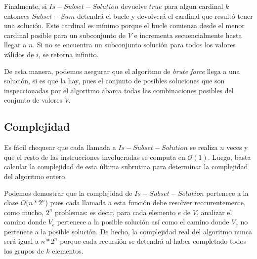 Finalmente, si $Is-Subset-Solution$ devuelve $true$ para algun cardinal $k$ entonces $Subset-Sum$ detendrá el bucle y devolverá el cardinal que resultó tener una solución. Este cardinal es mínimo porque el bucle comienza desde el menor cardinal posible para un subconjunto de $V$ e incrementa secuencialmente hasta llegar a $n$. Si no se encuentra un subconjunto solución para todos los valores válidos de $i$, se retorna infinito.

\vskip 8pt

De esta manera, podemos asegurar que el algoritmo de \textit{brute force} llega a una solución, si es que la hay, pues el conjunto de posibles soluciones que son inspeccionadas por el algoritmo abarca todas las combinaciones posibles del conjunto de valores $V$.

\subsection{Complejidad}
Es fácil chequear que cada llamada a $Is-Subset-Solution$ se realiza $n$ veces y que el resto de las instrucciones involucradas se computa en $\mathcal{O}(1)$. Luego, basta calcular la complejidad de esta última subrutina para determinar la complejidad del algoritmo entero.

\vskip 8pt

Podemos demostrar que la complejidad de $Is-Subset-Solution$ pertenece a la clase $O(n*2^{n}$) pues cada llamada a esta función debe resolver reccurentemente, como mucho, $2^{n}$ problemas: es decir, para cada elemento $e$ de $V$, analizar el camino donde $V_{e}$ pertenece a la posible solución así como el camino donde $V_{e}$ no pertenece a la posible solución. De hecho, la complejidad real del algoritmo nunca será igual a $n*2^{n}$ porque cada recursión se detendrá al haber completado todos los grupos de $k$ elementos.